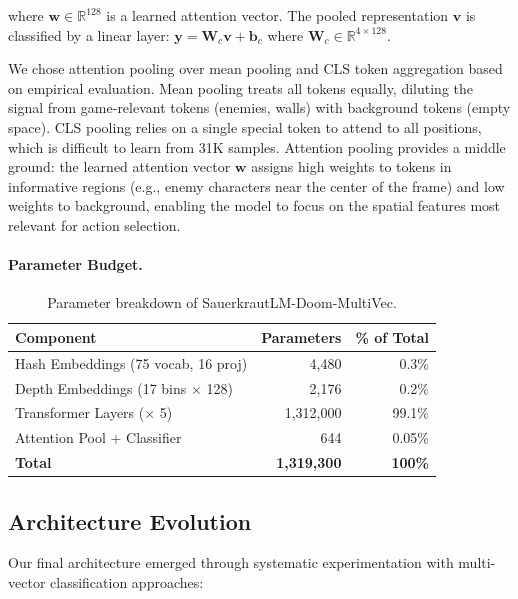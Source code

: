 \documentclass[11pt,a4paper]{article}
\begin{document}
where $\mathbf{w} \in \mathbb{R}^{128}$ is a learned attention vector. The pooled representation $\mathbf{v}$ is classified by a linear layer: $\mathbf{y} = \mathbf{W}_c \mathbf{v} + \mathbf{b}_c$ where $\mathbf{W}_c \in \mathbb{R}^{4 \times 128}$.

We chose attention pooling over mean pooling and CLS token aggregation based on empirical evaluation. Mean pooling treats all tokens equally, diluting the signal from game-relevant tokens (enemies, walls) with background tokens (empty space). CLS pooling relies on a single special token to attend to all positions, which is difficult to learn from 31K samples. Attention pooling provides a middle ground: the learned attention vector $\mathbf{w}$ assigns high weights to tokens in informative regions (e.g., enemy characters near the center of the frame) and low weights to background, enabling the model to focus on the spatial features most relevant for action selection.

\paragraph{Parameter Budget.}

\begin{table}[h]
\centering
\caption{Parameter breakdown of SauerkrautLM-Doom-MultiVec.}
\label{tab:params}
\begin{tabular}{lrr}
\toprule
\textbf{Component} & \textbf{Parameters} & \textbf{\% of Total} \\
\midrule
Hash Embeddings (75 vocab, 16 proj) & 4,480 & 0.3\% \\
Depth Embeddings (17 bins $\times$ 128) & 2,176 & 0.2\% \\
Transformer Layers ($\times$ 5) & 1,312,000 & 99.1\% \\
Attention Pool + Classifier & 644 & 0.05\% \\
\midrule
\textbf{Total} & \textbf{1,319,300} & \textbf{100\%} \\
\bottomrule
\end{tabular}
\end{table}

\subsection{Architecture Evolution}
\label{sec:evolution}

Our final architecture emerged through systematic experimentation with multi-vector classification approaches:
\end{document}
